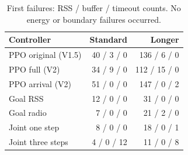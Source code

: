 \begin{table}[t]
\caption{First failures: RSS / buffer / timeout counts. No energy or boundary failures occurred.}
\label{tab:failures}\centering\small
\begin{tabular}{lrr}\toprule
Controller & Standard & Longer\\\midrule
PPO original (V1.5) & 40 / 3 / 0 & 136 / 6 / 0\\
PPO full (V2) & 34 / 9 / 0 & 112 / 15 / 0\\
PPO arrival (V2) & 51 / 0 / 0 & 147 / 0 / 2\\
Goal RSS & 12 / 0 / 0 & 31 / 0 / 0\\
Goal radio & 7 / 0 / 0 & 21 / 2 / 0\\
Joint one step & 8 / 0 / 0 & 18 / 0 / 1\\
Joint three steps & 4 / 0 / 12 & 11 / 0 / 8\\
\bottomrule\end{tabular}
\end{table}
